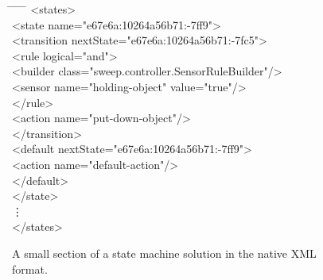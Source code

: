 \begin{figure}[ht]
  \centering
  \begin{minipage}{4in}
    \ttfamily
    \begin{tabbing}
      \hspace{4ex} \= \hspace{4ex} \= \hspace{4ex} \= \hspace{4ex} \= \hspace{4ex} \= \kill
      <states> \\
      \> <state name="e67e6a:10264a56b71:-7ff9"> \\
      \> \> <transition nextState="e67e6a:10264a56b71:-7fc5"> \\
      \> \> \> <rule logical="and"> \\
      \> \> \> \> <builder class="sweep.controller.SensorRuleBuilder"/> \\
      \> \> \> \> <sensor name="holding-object" value="true"/> \\
      \> \> \> </rule> \\
      \> \> \> <action name="put-down-object"/> \\
      \> \> </transition> \\
      \> \> <default nextState="e67e6a:10264a56b71:-7ff9"> \\
      \> \> \> <action name="default-action"/> \\
      \> \> </default> \\
      \> </state> \\
      \> \vdots \\
      </states> \\
    \end{tabbing}
  \end{minipage}
\caption{A small section of a state machine solution in the native XML format.}
\label{fig:ExampleStateMachine}
\end{figure}

